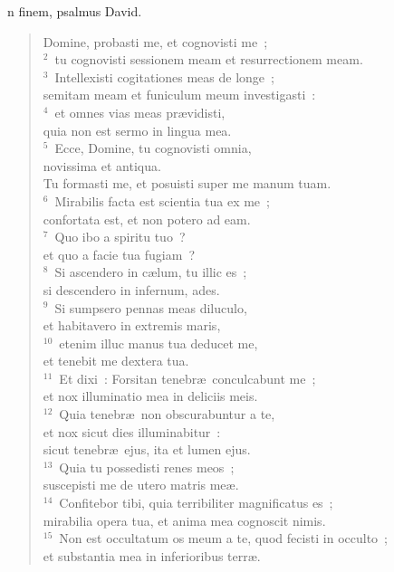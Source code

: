 \bchapter
{}n finem, psalmus David. \begin{flushleft}\begin{verse}\vspace{6pt}Domine, probasti me, et cognovisti me~;\\
${}^{2}$~tu cognovisti sessionem meam et resurrectionem meam.\\
${}^{3}$~Intellexisti cogitationes meas de longe~;\\ semitam meam et funiculum meum investigasti~:\\
${}^{4}$~et omnes vias meas pr\ae vidisti,\\ quia non est sermo in lingua mea.\\
${}^{5}$~Ecce, Domine, tu cognovisti omnia,\\ novissima et antiqua.\\ Tu formasti me, et posuisti super me manum tuam.\\
${}^{6}$~Mirabilis facta est scientia tua ex me~;\\ confortata est, et non potero ad eam.\\
${}^{7}$~Quo ibo a spiritu tuo~?\\ et quo a facie tua fugiam~?\\
${}^{8}$~Si ascendero in c\ae lum, tu illic es~;\\ si descendero in infernum, ades.\\
${}^{9}$~Si sumpsero pennas meas diluculo,\\ et habitavero in extremis maris,\\
${}^{10}$~etenim illuc manus tua deducet me,\\ et tenebit me dextera tua.\\
${}^{11}$~Et dixi~: Forsitan tenebr\ae\ conculcabunt me~;\\ et nox illuminatio mea in deliciis meis.\\
${}^{12}$~Quia tenebr\ae\ non obscurabuntur a te,\\ et nox sicut dies illuminabitur~:\\ sicut tenebr\ae\ ejus, ita et lumen ejus.\\
${}^{13}$~Quia tu possedisti renes meos~;\\ suscepisti me de utero matris me\ae .\\
${}^{14}$~Confitebor tibi, quia terribiliter magnificatus es~;\\ mirabilia opera tua, et anima mea cognoscit nimis.\\
${}^{15}$~Non est occultatum os meum a te, quod fecisti in occulto~;\\ et substantia mea in inferioribus terr\ae .\\

\end{verse}
\end{flushleft}

